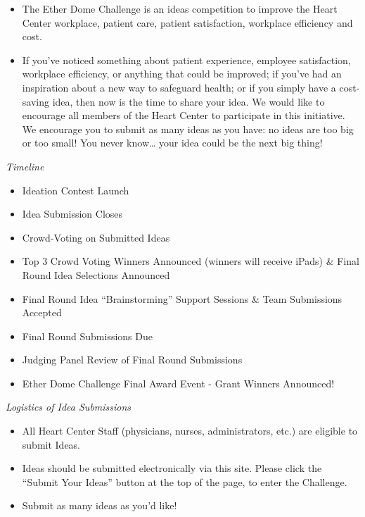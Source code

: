\documentclass[12pt, titlepage]{article}
\providecommand{\tightlist}{%
  \setlength{\itemsep}{0pt}\setlength{\parskip}{0pt}}
\begin{document}
\begin{itemize}
\item
  The Ether Dome Challenge is an ideas competition to improve the Heart
  Center workplace, patient care, patient satisfaction, workplace
  efficiency and cost.
\item
  If you've noticed something about patient experience, employee
  satisfaction, workplace efficiency, or anything that could be
  improved; if you've had an inspiration about a new way to safeguard
  health; or if you simply have a cost-saving idea, then now is the time
  to share your idea. We would like to encourage all members of the
  Heart Center to participate in this initiative. We encourage you to
  submit as many ideas as you have: no ideas are too big or too small!
  You never know\ldots{} your idea could be the next big thing!
\end{itemize}

\emph{Timeline}

\begin{itemize}
\tightlist
\item
  Ideation Contest Launch
\item
  Idea Submission Closes
\item
  Crowd-Voting on Submitted Ideas
\item
  Top 3 Crowd Voting Winners Announced (winners will receive iPads) \&
  Final Round Idea Selections Announced
\item
  Final Round Idea ``Brainstorming'' Support Sessions \& Team
  Submissions Accepted
\item
  Final Round Submissions Due
\item
  Judging Panel Review of Final Round Submissions
\item
  Ether Dome Challenge Final Award Event - Grant Winners Announced!
\end{itemize}

\emph{Logistics of Idea Submissions}

\begin{itemize}
\tightlist
\item
  All Heart Center Staff (physicians, nurses, administrators, etc.) are
  eligible to submit Ideas.
\item
  Ideas should be submitted electronically via this site. Please click
  the ``Submit Your Ideas'' button at the top of the page, to enter the
  Challenge.
\item
  Submit as many ideas as you'd like!
\end{itemize}
\end{document}
